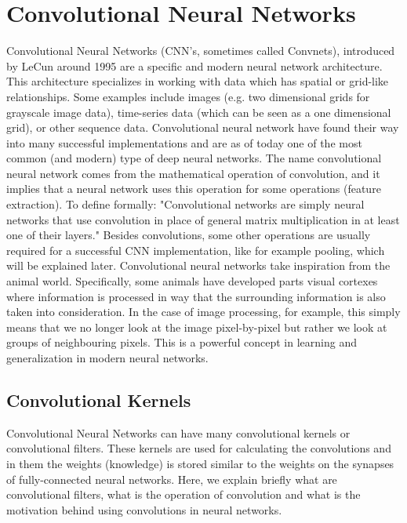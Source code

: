 \documentclass[b5paper]{book}
\let\cite\parencite
\begin{document}
\section{Convolutional Neural Networks}

Convolutional Neural Networks (CNN's, sometimes called Convnets), introduced by LeCun around 1995 \cite{lecun1995convolutional} are a specific and modern neural network architecture. This architecture specializes in working with data which has spatial or grid-like relationships. Some examples include images (e.g. two dimensional grids for grayscale image data), time-series data (which can be seen as a one dimensional grid), or other sequence data. Convolutional neural network have found their way into many successful implementations and are as of today one of the most common (and modern) type of deep neural networks. The name convolutional neural network comes from the mathematical operation of convolution, and it implies that a neural network uses this operation for some operations (feature extraction). To define formally: "Convolutional networks are simply neural networks that use convolution in place of general matrix multiplication in at least one of their layers." \cite{goodfellow2016deep} Besides convolutions, some other operations are usually required for a successful CNN implementation, like for example pooling, which will be explained later. Convolutional neural networks take inspiration from the animal world. Specifically, some animals have developed parts visual cortexes where information is processed in way that the surrounding information is also taken into consideration. In the case of image processing, for example, this simply means that we no longer look at the image pixel-by-pixel but rather we look at groups of neighbouring pixels. This is a powerful concept in learning and generalization in modern neural networks.

\subsection{Convolutional Kernels}

Convolutional Neural Networks can have many convolutional kernels or convolutional filters. These kernels are used for calculating the convolutions and in them the weights (knowledge) is stored similar to the weights on the synapses of fully-connected neural networks. Here, we explain briefly what are convolutional filters, what is the operation of convolution and what is the motivation behind using convolutions in neural networks.
\end{document}
